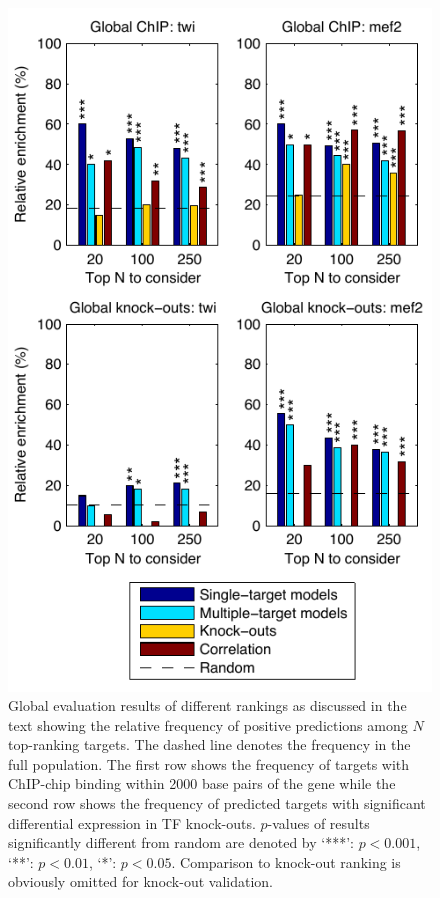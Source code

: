 \documentclass{pnastwo}
\begin{document}
\begin{article}
\begin{figure}[tb]
  \centering
  \includegraphics{fig3}
  \caption{Global evaluation results of different rankings as
    discussed in the text showing the relative frequency of positive
    predictions among $N$ top-ranking targets.
    The dashed line
    denotes the frequency in the full population.
    The first row shows the frequency of targets with ChIP-chip
    binding within 2000 base pairs of the gene
    while the second row shows the frequency of
    predicted targets with significant differential
    expression in TF knock-outs.
    $p$-values of results significantly different from random are
    denoted by `***': $p <
    0.001$, `**': $p < 0.01$, `*': $p < 0.05$.
    Comparison to knock-out ranking is obviously omitted for knock-out
    validation. \label{fig:dros_global_evaluation}
  }
\end{figure}


\end{article}
\end{document}
